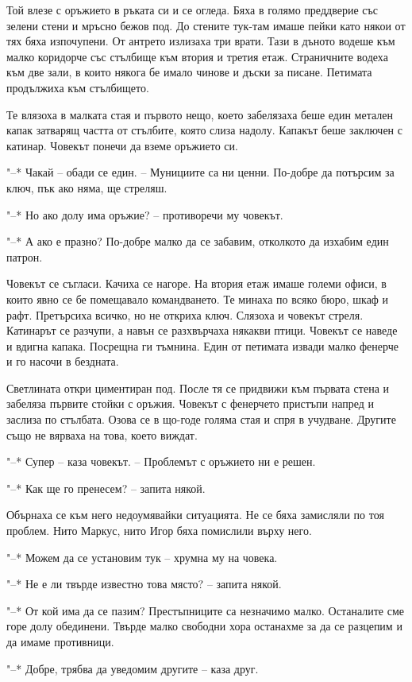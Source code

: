 \documentclass[ebook,openany,12pt]{memoir}
\begin{document}
Той влезе с оръжието в ръката си и се огледа. Бяха в голямо преддверие със зелени стени и мръсно бежов под. До стените тук-там имаше пейки като някои от тях бяха изпочупени. От антрето излизаха три врати. Тази в дъното водеше към малко коридорче със стълбище към втория и третия етаж. Страничните водеха към две зали, в които някога бе имало чинове и дъски за писане. Петимата продължиха към стълбището.

Те влязоха в малката стая и първото нещо, което забелязаха беше един метален капак затварящ частта от стълбите, която слиза надолу. Капакът беше заключен с катинар. Човекът понечи да вземе оръжието си.

"--* Чакай – обади се един. – Мунициите са ни ценни. По-добре да потърсим за ключ, пък ако няма, ще стреляш.

"--* Но ако долу има оръжие? – противоречи му човекът.

"--* А ако е празно? По-добре малко да се забавим, отколкото да изхабим един патрон.

Човекът се съгласи. Качиха се нагоре. На втория етаж имаше големи офиси, в които явно се бе помещавало командването. Те минаха по всяко бюро, шкаф и рафт. Претърсиха всичко, но не откриха ключ. Слязоха и човекът стреля. Катинарът се разчупи, а навън се разхвърчаха някакви птици. Човекът се наведе и вдигна капака. Посрещна ги тъмнина. Един от петимата извади малко фенерче и го насочи в бездната.

Светлината откри циментиран под. После тя се придвижи към първата стена и забеляза първите стойки с оръжия. Човекът с фенерчето пристъпи напред и заслиза по стълбата. Озова се в що-годе голяма стая и спря в учудване. Другите също не вярваха на това, което виждат.

"--* Супер – каза човекът. – Проблемът с оръжието ни е решен.

"--* Как ще го пренесем? – запита някой.

Обърнаха се към него недоумявайки ситуацията. Не се бяха замисляли по тоя проблем. Нито Маркус, нито Игор бяха помислили върху него.

"--* Можем да се установим тук – хрумна му на човека.

"--* Не е ли твърде известно това място? – запита някой.

"--* От кой има да се пазим? Престъпниците са незначимо малко. Останалите сме горе долу обединени. Твърде малко свободни хора останахме за да се разцепим и да имаме противници.

"--* Добре, трябва да уведомим другите – каза друг.
\end{document}
